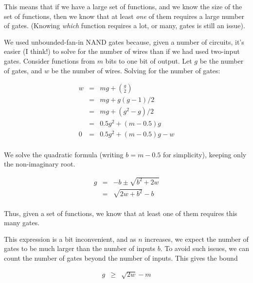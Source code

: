 \documentclass[12pt]{article}
\theoremstyle{definition}
\begin{document}
This means that if we have a large set of functions, and we know the size of
the set of functions, then we know that at least {\em one} of them requires
a large number of gates. (Knowing {\em which} function requires a lot, or many,
gates is still an issue).

We used unbounded-fan-in NAND gates because, given a number of circuits,
it's easier (I think!) to solve for the number of wires than if we had
used two-input gates.
Consider functions from $m$ bits to one bit of output.
Let $g$ be the number of gates, and $w$ be the number of wires.
Solving for the number of gates:

\begin{eqnarray*}
w & = & mg + {g \choose 2} \\
  & = & mg + g(g-1)/2 \\
  & = & mg + (g^2 - g) / 2 \\
  & = & 0.5g^2 + (m-0.5)g \\
0 & = & 0.5g^2 + (m-0.5)g - w \\
\end{eqnarray*}

We solve the quadratic formula (writing $b = m-0.5$ for simplicity), keeping
only the non-imaginary root.

\begin{eqnarray*}
g & = & -b \pm \sqrt{ b^2 + 2w} \\
  & = & {\sqrt {2w + b^2}} - b \\
\end{eqnarray*}

Thus, given a set of functions, we know that at least one of them requires
this many gates.

This expression is a bit inconvenient, and as $n$ increases, we
expect the number of gates to be much larger than the number of
inputs $b$. To avoid such issues, we can count the number of gates
beyond the number of inputs. This gives the bound

\begin{eqnarray*}
	g & \ge & \sqrt{2w} - m \\
\end{eqnarray*}




\end{document}
